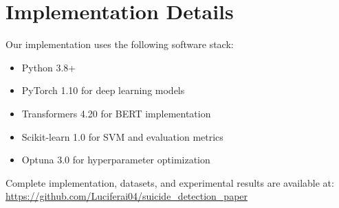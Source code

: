 \documentclass[conference]{IEEEtran}
\begin{document}
\section{Implementation Details}
\label{app:implementation}

Our implementation uses the following software stack:
\begin{itemize}
    \item Python 3.8+
    \item PyTorch 1.10 for deep learning models
    \item Transformers 4.20 for BERT implementation
    \item Scikit-learn 1.0 for SVM and evaluation metrics
    \item Optuna 3.0 for hyperparameter optimization
\end{itemize}

Complete implementation, datasets, and experimental results are available at: \url{https://github.com/Luciferai04/suicide_detection_paper}
\end{document}
